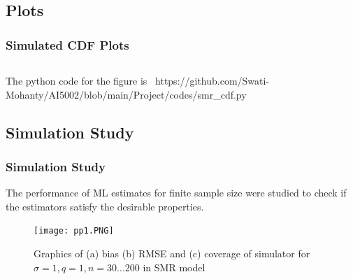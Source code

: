 \documentclass{beamer}
\begin{document}
\subsection{Plots}
\begin{frame}
\frametitle{Simulated CDF Plots }
\footnotesize
\label{a}
\begin{columns}

\end{columns}
The python code for the figure is
\hbox{
https://github.com/Swati-Mohanty/AI5002/blob/main/Project/codes/smr\_cdf.py}

\end{frame}

\subsection*{Simulation Study}
\begin{frame}[fragile]
\footnotesize
\frametitle{Simulation Study}
The performance of ML estimates for finite sample size were studied to check if the estimators satisfy the desirable properties.
\begin{figure}[h]
\renewcommand{\theenumi}{1}
\centering
\texttt{[image: pp1.PNG]}
\caption{Graphics of (a) bias (b) RMSE and (c) coverage of simulator for $\sigma =1 , q = 1 , n = 30...200$ in SMR model }
\label{Fig:1}
\end{figure}

\end{frame}
\end{document}
